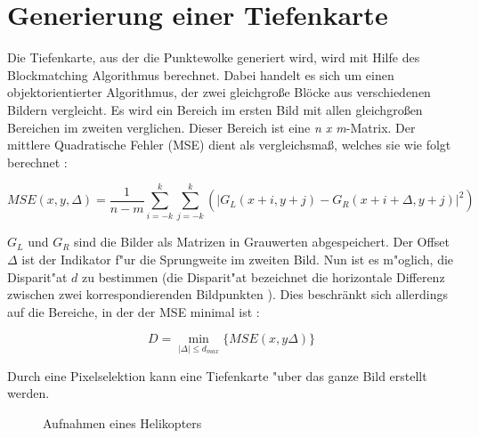\section{Generierung einer Tiefenkarte} 
\label{sec:gernerierungdep}

Die Tiefenkarte, aus der die Punktewolke generiert wird, wird mit Hilfe des Blockmatching Algorithmus berechnet. Dabei handelt es sich um einen objektorientierter Algorithmus, der zwei gleichgroße Blöcke aus verschiedenen Bildern vergleicht. Es wird ein Bereich im ersten Bild mit allen gleichgroßen Bereichen im zweiten verglichen. Dieser Bereich ist eine \textit{n x m}-Matrix. Der mittlere Quadratische Fehler (MSE) dient als vergleichsmaß, welches sie wie folgt berechnet \cite{HAW}:

\begin{equation}
MSE(x,y,\Delta) = \dfrac{1}{n-m} \sum_{i=-k}^k \sum_{j=-k}^k (|G_{L}(x+i, y+j) - G_{R}(x+i+\Delta, y+j)|^2)
\end{equation}

\noindent $G_{L}$ und $G_{R}$ sind die Bilder als Matrizen in Grauwerten abgespeichert. Der Offset $\Delta$ ist der Indikator f"ur die Sprungweite im zweiten Bild. Nun ist es m"oglich, die Disparit"at $d$ zu bestimmen (die Disparit"at bezeichnet die horizontale Differenz zwischen zwei korrespondierenden Bildpunkten \cite{disp}). Dies beschränkt sich allerdings auf die Bereiche, in der der MSE minimal ist \cite{HAW}:

\begin{equation}
D=\min_{|\Delta|\leq d_{max}} \{MSE(x,y\Delta)\}
\end{equation}

\noindent Durch eine Pixelselektion kann eine Tiefenkarte "uber das ganze Bild erstellt werden.

\begin{figure}%
	\centering
	\qquad
	\caption{Aufnahmen eines Helikopters}%
	\label{fig:stereoheli}%
\end{figure}

